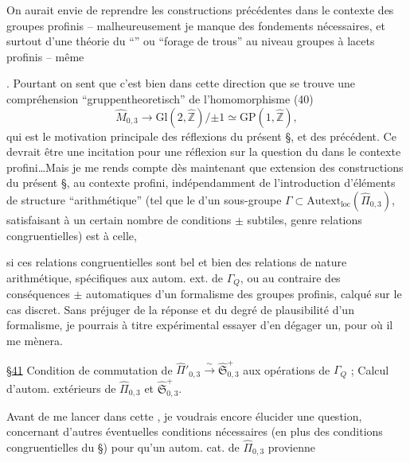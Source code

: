 On aurait envie de reprendre les
constructions précédentes dans le contexte
des groupes profinis -- malheureusement
je manque des fondements nécessaires,
et surtout d'une théorie du ``''
ou ``forage de trous'' au niveau groupes
à lacets profinis -- même    

. Pourtant on sent que c'est
bien dans cette direction que se trouve
une compréhension ``gruppentheoretisch''
de l'homomorphisme  (40)
\[
\widehat{M}_{0,3}\longrightarrow
\mathrm{Gl}(2,\widehat{\mathbb Z})/\mathord{\pm}1
\simeq\mathrm{GP}(1,\widehat{\mathbb Z}),
\]
qui est le motivation principale des
réflexions du présent \S, et des précédent.
Ce devrait être une incitation pour une
réflexion  sur la question du
 dans le contexte profini\ldots Mais
je me rends compte dès maintenant
que   extension des constructions du
présent \S, au contexte profini, indépendamment
de l'introduction d'éléments
de structure ``arithmétique'' (tel que
le \uline{} d'un sous-groupe
$\Gamma\subset\mathrm{Autext}_{\mathrm{loc}}(\widehat{\Pi}_{0,3})$,
satisfaisant à un certain nombre de
conditions $\pm$ subtiles, genre relations
congruentielles) est  à celle,


si ces relations congruentielles sont bel et
bien des relations de nature arithmétique,
spécifiques aux autom. ext. 
de $\Gamma_Q$, ou au contraire des
conséquences $\pm$ automatiques d'un
formalisme  des groupes profinis,  calqué
sur le cas discret. Sans préjuger 
de la réponse et du degré de
plausibilité d'un  formalisme, je
pourrais à titre expérimental essayer
d'en dégager un, pour  où il
me mènera.

\uline{\S 41} Condition de commutation de
$\widehat{\Pi}'_{0,3}\xrightarrow{\sim}\widehat{\mathfrak S}_{0,3}^{+}$
aux opérations de $\Gamma_Q$ ; Calcul d'autom.
extérieurs de $\widehat{\Pi}_{0,3}$ et $\widehat{\mathfrak S}_{0,3}^{+}$.

Avant de me lancer dans cette
, je voudrais encore élucider
une question, concernant d'autres
éventuelles conditions nécessaires (en plus
des conditions congruentielles du \S{})
pour qu'un autom. cat. de $\widehat{\Pi}_{0,3}$ provienne

